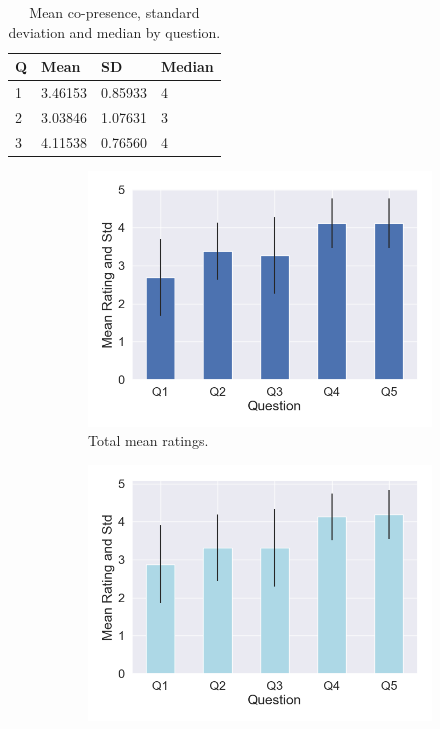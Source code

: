 \begin{table}
\centering
\begin{tabular}{|llll|}
\hline
Q & Mean & SD & Median \\
\hline
1 &  3.46153 & 0.85933&4\\  
2 &  3.03846 & 1.07631&3\\ 
3 &  4.11538 & 0.76560&4\\ 
\hline
\end{tabular}
\caption{Mean co-presence, standard deviation and median by question.}
\label{tbl:copres}
\end{table}
 
\pagebreak
\begin{figure}[H]
\hspace{-15mm}
\begin{subfigure}[b]{0.5\textwidth}
 \centering
 \includegraphics[scale=0.5]{Files/Plots/presence_mean_ratings.png}
 \caption{Total mean ratings. }
 \label{fig:presAllMean}
 \end{subfigure}
 \hspace{10mm}
\begin{subfigure}[b]{0.5\textwidth}
 \centering
 \includegraphics[scale=0.5]{Files/Plots/presence_mean_ratings_f.png}

\end{subfigure}
\end{figure}
